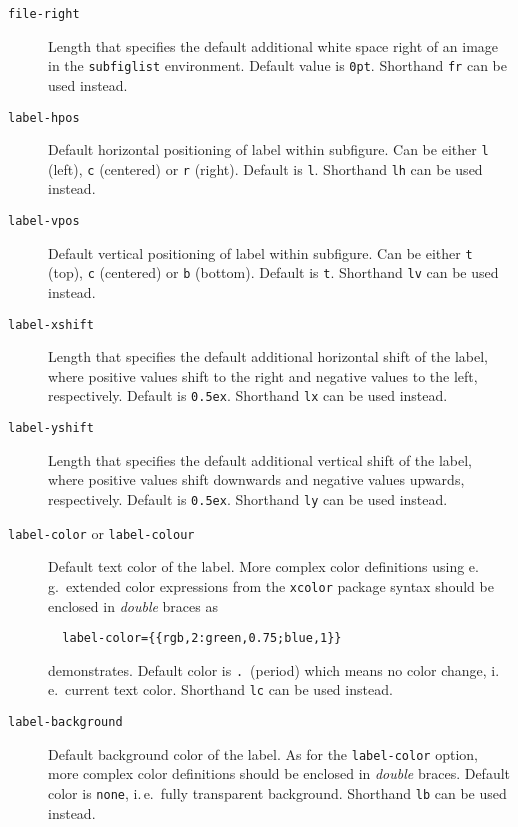 \documentclass[version=3.12,american]{scrartcl}
\begin{document}
\begin{description}
\item[\texttt{file-right}\enskip] Length that specifies the default additional white space right of an image in the \texttt{subfiglist} environment. Default value is \texttt{0pt}. Shorthand \texttt{fr} can be used instead.

\item[\texttt{label-hpos}\enskip] Default horizontal positioning of label within subfigure. Can be either \texttt{l} (left), \texttt{c} (centered) or \texttt{r} (right). Default is \texttt{l}. Shorthand \texttt{lh} can be used instead.

\item[\texttt{label-vpos}\enskip] Default vertical positioning of label within subfigure. Can be either \texttt{t} (top), \texttt{c} (centered) or \texttt{b} (bottom). Default is \texttt{t}. Shorthand \texttt{lv} can be used instead.

\item[\texttt{label-xshift}\enskip] Length that specifies the default additional horizontal shift of the label, where positive values shift to the right and negative values to the left, respectively. Default is \texttt{0.5ex}. Shorthand \texttt{lx} can be used instead.

\item[\texttt{label-yshift}\enskip] Length that specifies the default additional vertical shift of the label, where positive values shift downwards and negative values upwards, respectively. Default is \texttt{0.5ex}. Shorthand \texttt{ly} can be used instead.

\item[\texttt{label-color} or \texttt{label-colour}\enskip] Default text color of the label. More complex color definitions using e.\,g.\ extended color expressions from the \texttt{xcolor} package syntax should be enclosed in \emph{double} braces as
\begin{verbatim}
  label-color={{rgb,2:green,0.75;blue,1}}
\end{verbatim}
demonstrates. Default color is \texttt{.}\ (period) which means no color change, i.\,e.\ current text color. Shorthand \texttt{lc} can be used instead.

\item[\texttt{label-background}\enskip] Default background color of the label. As for the \texttt{label-color} option, more complex color definitions should be enclosed in \emph{double} braces. Default color is \texttt{none}, i.\,e.\ fully transparent background. Shorthand \texttt{lb} can be used instead.
\end{description}
\end{document}
